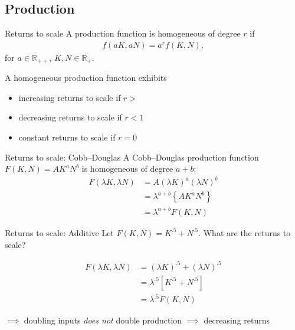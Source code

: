 \documentclass[presentation,dvipsnames]{beamer}
\begin{document}
\subsection{Production}
\begin{frame}[label=sec-2-6]{Returns to scale}
A production function is homogeneous of degree $r$ if
\begin{align*}
f(aK,aN) = a^{r} f(K,N),
\end{align*}
for $a \in \mathbb{R}_{++}$, $K,N \in \mathbb{R}_{+}$.

A homogeneous production function exhibits
\begin{itemize}[label={--}]
\item increasing returns to scale if $r > $
\item decreasing returns to scale if $r < 1$
\item constant returns to scale if $r = 0$
\end{itemize}
\end{frame}

\begin{frame}[label=sec-2-6]{Returns to scale: Cobb--Douglas}
A Cobb--Douglas production function $F(K,N) = AK^{a}N^{b}$ is homogeneous of degree $a + b$:
\begin{align*}
F(\lambda K, \lambda N) &= A \left( \lambda K \right)^{a} \left( \lambda N \right)^{b} \\
&= \lambda^{a+b} \left\{ AK^{a}N^{b} \right\} \\
&= \lambda^{a+b} F(K,N)
\end{align*}
\end{frame}

\begin{frame}[label=sec-2-6]{Returns to scale: Additive}
Let $F(K,N) = K^{.5} + N^{.5}$. What are the returns to scale?

\begin{align*}
F(\lambda K, \lambda N) &= \left( \lambda K \right)^{.5} + \left( \lambda N \right)^{.5} \\
&= \lambda^{.5} \left[ K^{.5} + N^{.5} \right] \\
&= \lambda^{.5} F(K,N)
\end{align*}

$\implies$ doubling inputs \emph{does not} double production $\implies$ decreasing returns
\end{frame}
\end{document}
